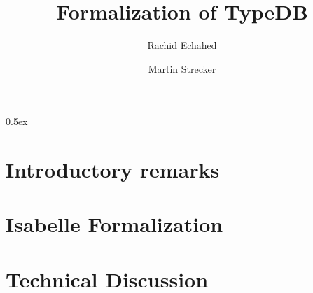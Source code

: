 \documentclass[11pt,a4paper]{report}
\begin{document}
\title{Formalization of TypeDB}
\author{Rachid Echahed \and Martin Strecker}
\maketitle

\tableofcontents

\parindent 0pt\parskip 0.5ex



\chapter{Introductory remarks}\label{ch:introductory_remarks}



\chapter{Isabelle Formalization}\label{ch:isabelle_formalization}



\appendix


\chapter{Technical Discussion}\label{ch:technical_issues}





%
%
\end{document}
